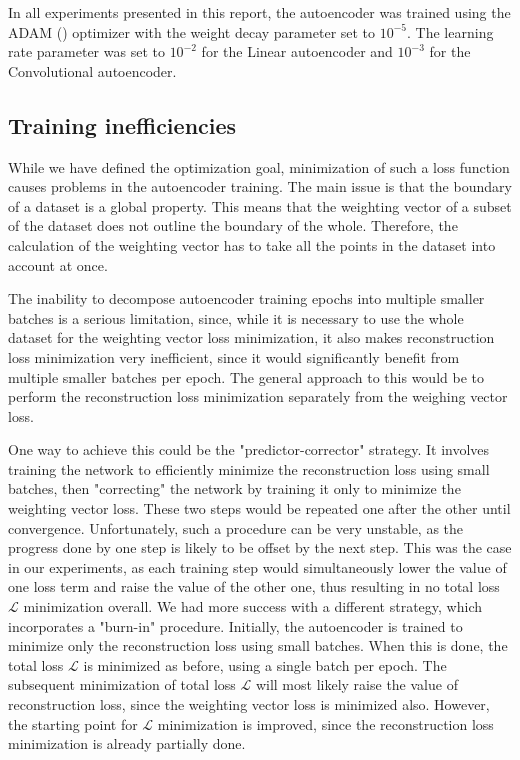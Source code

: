 \documentclass{article}
\begin{document}
In all experiments presented in this report, the autoencoder was trained using the ADAM (\cite{Kingma2014}) optimizer with the weight decay parameter set to $10^{-5}$. The learning rate parameter was set to $10^{-2}$ for the Linear autoencoder and $10^{-3}$ for the Convolutional autoencoder.

\subsection{Training inefficiencies}

While we have defined the optimization goal, minimization of such a loss function causes problems in the autoencoder training. The main issue is that the boundary of a dataset is a global property. This means that the weighting vector of a subset of the dataset does not outline the boundary of the whole. Therefore, the calculation of the weighting vector has to take all the points in the dataset into account at once.

The inability to decompose autoencoder training epochs into multiple smaller batches is a serious limitation, since, while it is necessary to use the whole dataset for the weighting vector loss minimization, it also makes reconstruction loss minimization very inefficient, since it would significantly benefit from multiple smaller batches per epoch. The general approach to this would be to perform the reconstruction loss minimization separately from the weighing vector loss.

One way to achieve this could be the "predictor-corrector" strategy. It involves training the network to efficiently minimize the reconstruction loss using small batches, then "correcting" the network by training it only to minimize the weighting vector loss. These two steps would be repeated one after the other until convergence. Unfortunately, such a procedure can be very unstable, as the progress done by one step is likely to be offset by the next step. This was the case in our experiments, as each training step would simultaneously lower the value of one loss term and raise the value of the other one, thus resulting in no total loss $\mathcal{L}$ minimization overall. We had more success with a different strategy, which incorporates a "burn-in" procedure. Initially, the autoencoder is trained to minimize only the reconstruction loss using small batches. When this is done, the total loss $\mathcal{L}$ is minimized as before, using a single batch per epoch. The subsequent minimization of total loss $\mathcal{L}$ will most likely raise the value of reconstruction loss, since the weighting vector loss is minimized also. However, the starting point for $\mathcal{L}$ minimization is improved, since the reconstruction loss minimization is already partially done.
\end{document}
